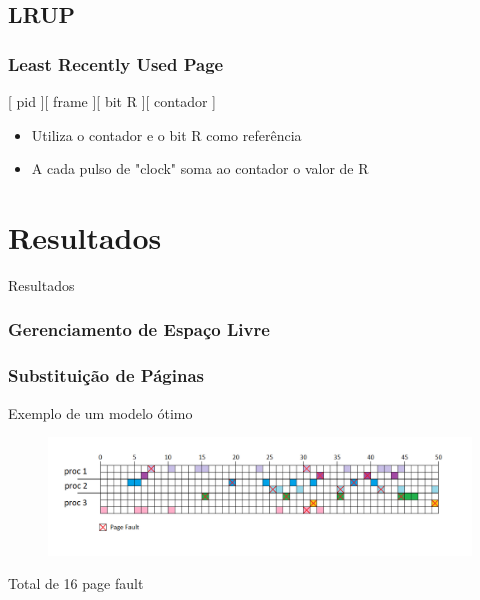\documentclass{beamer}
\begin{document}
\subsection{LRUP}
\begin{frame}
\frametitle{Least Recently Used Page}

\begin{center}
[ pid ][ frame ][ bit R ][ contador ]
\end{center}

\begin{itemize}
\item Utiliza o contador e o bit R como referência

\item A cada pulso de "clock" soma ao contador o valor de R
\end{itemize}
\justifying
\end{frame}

\section{Resultados} 
\begin{frame}
\begin{LARGE}
\begin{center}
Resultados
\end{center}
\end{LARGE}
\end{frame}

\begin{frame}
\frametitle{Gerenciamento de Espaço Livre} 

\justifying
\end{frame}


\begin{frame}
\frametitle{Substituição de Páginas} 

Exemplo de um modelo ótimo

\begin{figure}
\centering
\includegraphics[scale=0.4]{ressubs1.png}
\end{figure}

Total de 16 page fault

\justifying
\end{frame}
\end{document}

